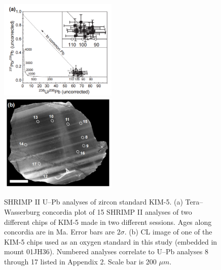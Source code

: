 \documentclass{article}
\begin{document}
\begin{figure}[h!]
      	\includegraphics[width=0.5\textwidth]{1_a.png}
      	\includegraphics[width=0.5\textwidth]{1_b.png}
      	\caption{SHRIMP II U–Pb analyses of zircon standard KIM-5. (a)
      		Tera–Wasserburg concordia plot of 15 SHRIMP II analyses of two
      		different chips of KIM-5 made in two different sessions. Ages along
      		concordia are in Ma. Error bars are $2\sigma$. (b) CL image of one of the
      		KIM-5 chips used as an oxygen standard in this study (embedded in
      		mount 01JH36). Numbered analyses correlate to U–Pb analyses
      		8 through 17 listed in Appendix 2. Scale bar is 200 $\mu m$.}
\end{figure}

\end{document}
